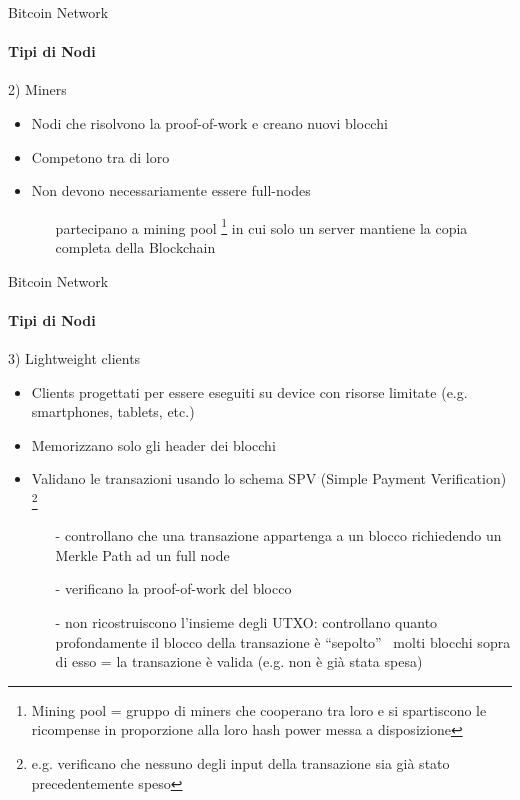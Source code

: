 \documentclass{beamer}
\begin{document}
  
  
  
   \begin{frame}{Bitcoin Network}
    \framesubtitle{Tipi di Nodi}
    \begin{block}{2) Miners}
        \begin{itemize}
            \item Nodi che risolvono la proof-of-work e creano nuovi blocchi
            \item Competono tra di loro 
            \item Non devono necessariamente essere full-nodes
            \begin{itemize}
                \item[\MVRightarrow] partecipano a mining pool \footnote{Mining pool = gruppo di miners che cooperano tra loro e si spartiscono le ricompense in proporzione alla loro hash power messa a disposizione} in cui solo un server mantiene la copia completa della Blockchain
            \end{itemize}
        \end{itemize}
    \end{block}
  \end{frame}
  
  
  
  
  \begin{frame}{Bitcoin Network}
    \framesubtitle{Tipi di Nodi}
    \begin{block}{3) Lightweight clients}
        \begin{itemize}
            \item Clients progettati per essere eseguiti su device con risorse limitate (e.g. smartphones, tablets, etc.) 
            \item Memorizzano solo gli header dei blocchi 
            \item Validano le transazioni usando lo schema SPV (Simple Payment Verification) \footnote{e.g. verificano che nessuno degli input della transazione sia già stato precedentemente speso}
            \begin{itemize}
                \item[-] controllano che una transazione appartenga a un blocco richiedendo un Merkle Path ad un full node
                \item[-] verificano la proof-of-work del blocco
                \item[-] non ricostruiscono l'insieme degli UTXO: controllano quanto profondamente il blocco della transazione è ``sepolto'' \MVRightarrow\, molti blocchi sopra di esso = la transazione è valida (e.g. non è già stata spesa)
            \end{itemize}
        \end{itemize}
    \end{block}
  \end{frame}
  
\end{document}
